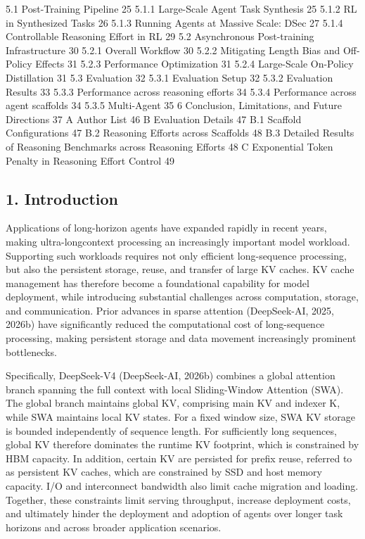 \documentclass[
  10
]{article}
\begin{document}
5.1 Post-Training Pipeline 25 5.1.1 Large-Scale Agent Task Synthesis 25
5.1.2 RL in Synthesized Tasks 26 5.1.3 Running Agents at Massive Scale:
DSec 27 5.1.4 Controllable Reasoning Effort in RL 29 5.2 Asynchronous
Post-training Infrastructure 30 5.2.1 Overall Workflow 30 5.2.2
Mitigating Length Bias and Off-Policy Effects 31 5.2.3 Performance
Optimization 31 5.2.4 Large-Scale On-Policy Distillation 31 5.3
Evaluation 32 5.3.1 Evaluation Setup 32 5.3.2 Evaluation Results 33
5.3.3 Performance across reasoning efforts 34 5.3.4 Performance across
agent scaffolds 34 5.3.5 Multi-Agent 35 6 Conclusion, Limitations, and
Future Directions 37 A Author List 46 B Evaluation Details 47 B.1
Scaffold Configurations 47 B.2 Reasoning Efforts across Scaffolds 48 B.3
Detailed Results of Reasoning Benchmarks across Reasoning Efforts 48 C
Exponential Token Penalty in Reasoning Effort Control 49

\subsection{1. Introduction}\label{introduction}

Applications of long-horizon agents have expanded rapidly in recent
years, making ultra-longcontext processing an increasingly important
model workload. Supporting such workloads requires not only efficient
long-sequence processing, but also the persistent storage, reuse, and
transfer of large KV caches. KV cache management has therefore become a
foundational capability for model deployment, while introducing
substantial challenges across computation, storage, and communication.
Prior advances in sparse attention (DeepSeek-AI, 2025, 2026b) have
significantly reduced the computational cost of long-sequence
processing, making persistent storage and data movement increasingly
prominent bottlenecks.

Specifically, DeepSeek-V4 (DeepSeek-AI, 2026b) combines a global
attention branch spanning the full context with local Sliding-Window
Attention (SWA). The global branch maintains global KV, comprising main
KV and indexer K, while SWA maintains local KV states. For a fixed
window size, SWA KV storage is bounded independently of sequence length.
For sufficiently long sequences, global KV therefore dominates the
runtime KV footprint, which is constrained by HBM capacity. In addition,
certain KV are persisted for prefix reuse, referred to as persistent KV
caches, which are constrained by SSD and host memory capacity. I/O and
interconnect bandwidth also limit cache migration and loading. Together,
these constraints limit serving throughput, increase deployment costs,
and ultimately hinder the deployment and adoption of agents over longer
task horizons and across broader application scenarios.
\end{document}
